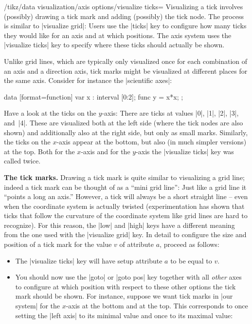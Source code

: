 \begin{key}{/tikz/data visualization/axis options/visualize ticks=}
  Visualizing a tick involves (possibly) drawing a tick mark and
  adding (possibly) the tick node. The process is similar to
  |visualize grid|: Users use the |ticks| key to configure how many
  ticks they would like for an axis and at which positions. The axis
  system uses the |visualize ticks| key to specify where these ticks
  should actually be shown.

  Unlike grid lines, which are typically only visualized once for each
  combination of an axis and a direction axis, tick marks might be
  visualized at different places for the same axis. Consider for
  instance the |scientific axes|:
\begin{codeexample}[]
\tikz \datavisualization [scientific axes, all axes={length=3cm},
                          x axis={ticks={stack}},
                          visualize as smooth line]
  data [format=function] {
    var x : interval [0:2];
    func y = \value  x*\value x;
  };
\end{codeexample}
  Have a look at the ticks on the $y$-axis: There are ticks at values |0|,
  |1|, |2|, |3|, and~|4|. These are visualized both at the left
  side (where the tick nodes are also shown) and additionally also at
  the right side, but only as small marks. Similarly, the ticks on the
  $x$-axis appear at the bottom, but also (in much simpler versions)
  at the top. Both for the $x$-axis and for the $y$-axis the
  |visualize ticks| key was called twice.

  \medskip
  \textbf{The tick marks.}
  Drawing a tick mark is quite similar to visualizing a grid line;
  indeed a tick mark can be thought of as a ``mini grid line'': Just
  like a grid line it ``points a long an axis.'' However, a tick will
  always be a short straight line -- even when the coordinate system
  is actually twisted (experimentation has shown that ticks that
  follow the curvature of the coordinate system like grid lines are
  hard to recognize). For this reason, the |low| and |high| keys have
  a different meaning from the one used with the |visualize grid|
  key. In detail to configure the size and position of a tick mark for
  the value $v$ of attribute $a$, proceed as follows:
  \begin{itemize}
  \item The |visualize ticks| key will have setup attribute $a$ to be
    equal to $v$.
  \item You should now use the |goto| or |goto pos| key together with all
    \emph{other} axes to configure at which position with respect to
    these other options the tick mark should be shown. For instance,
    suppose we want tick marks in |our system| for the $x$-axis at the
    bottom and at the top. This corresponds to once setting the
    |left axis| to its minimal value and once to its maximal value:


\end{itemize}
\end{key}
